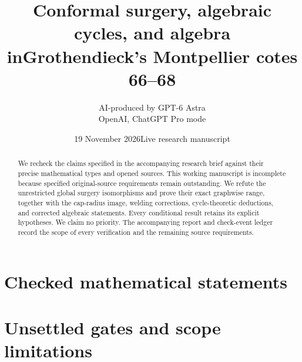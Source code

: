 \documentclass[11pt,a4paper]{article}
\title{Conformal surgery, algebraic cycles, and algebra in\newline Grothendieck's Montpellier cotes 66--68}
\author{AI-produced by GPT-6 Astra\\OpenAI, ChatGPT Pro mode}
\date{19 November 2026\quad Live research manuscript}
\theoremstyle{definition}
\begin{document}
\maketitle
\begin{abstract}
We recheck the claims specified in the accompanying research brief against their precise mathematical types and opened sources. This working manuscript is incomplete because specified original-source requirements remain outstanding. We refute the unrestricted global surgery isomorphisms and prove their exact graphwise range, together with the cap-radius image, welding corrections, cycle-theoretic deductions, and corrected algebraic statements. Every conditional result retains its explicit hypotheses. We claim no priority. The accompanying report and check-event ledger record the scope of every verification and the remaining source requirements.
\end{abstract}
\tableofcontents
\clearpage
\part{Checked mathematical statements}




\clearpage
\part{Unsettled gates and scope limitations}


\end{document}
